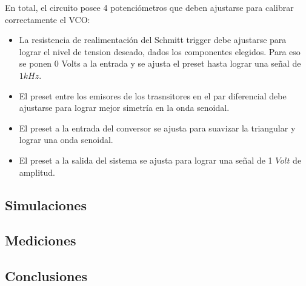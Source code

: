 En total, el circuito posee 4 potenciómetros que deben ajustarse para calibrar correctamente el VCO:


\begin{itemize}
\item La resistencia de realimentación del Schmitt trigger debe ajustarse para lograr el nivel de tension deseado, dados los componentes elegidos. Para eso se ponen 0 Volts a la entrada y se ajusta el preset hasta lograr una señal de $1kHz$.
\item El preset entre los emisores de los trasnsitores en el par diferencial debe ajustarse para lograr mejor simetría en la onda senoidal.
\item El preset a la entrada del conversor se ajusta para suavizar la triangular y lograr una onda senoidal.
\item El preset a la salida del sistema se ajusta para lograr una señal de 1 $Volt$ de amplitud. 
\end{itemize}


\subsection{Simulaciones}

\subsection{Mediciones}

\subsection{Conclusiones}









